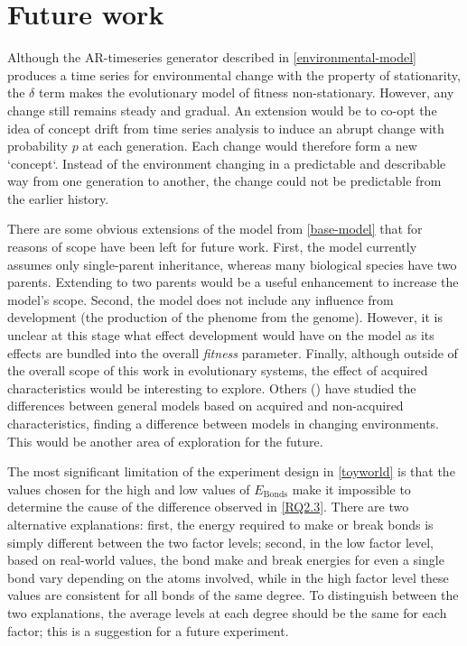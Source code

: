 \section{Future work}

Although the AR-timeseries generator described in \cref{environmental-model} produces a time series for environmental change with the property of stationarity, the $\delta$ term makes the evolutionary model of fitness non-stationary. However, any change still remains steady and gradual. An extension would be to co-opt the idea of concept drift from time series analysis to induce an abrupt change with probability $p$ at each generation. Each change would therefore form a new `concept`. Instead of the environment changing in a predictable and describable way from one generation to another, the change could not be predictable from the earlier history.

There are some obvious extensions of the model from \cref{base-model} that for reasons of scope have been left for future work. First, the model currently assumes only single-parent inheritance, whereas many biological species have two parents. Extending to two parents would be a useful enhancement to increase the model's scope. Second, the model does not include any influence from development (the production of the phenome from the genome). However, it is unclear at this stage what effect development would have on the model as its effects are bundled into the overall \emph{fitness} parameter. Finally, although outside of the overall scope of this work in evolutionary systems, the effect of acquired characteristics would be interesting to explore. Others (\eg \textcite{Gaucherel2012,Paenke:2007ie,Sasaki:2000dq}) have studied the differences between general models based on acquired and non-acquired characteristics, finding a difference between models in changing environments. This would be another area of exploration for the future.

The most significant limitation of the experiment design in \cref{toyworld} is that the values chosen for the high and low values of $E_\mathrm{Bonds}$ make it impossible to determine the cause of the difference observed in \cref{RQ2.3}. There are two alternative explanations: first, the energy required to make or break bonds is simply different between the two factor levels; second, in the low factor level, based on real-world values, the bond make and break energies for even a single bond vary depending on the atoms involved, while in the high factor level these values are consistent for all bonds of the same degree. To distinguish between the two explanations, the average levels at each degree should be the same for each factor; this is a suggestion for a future experiment.

